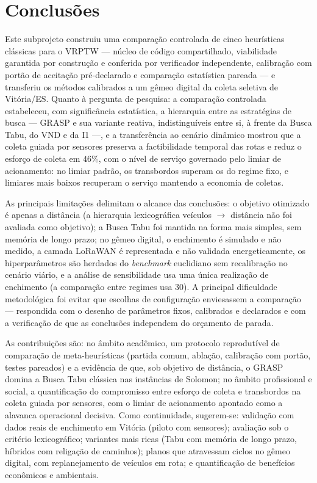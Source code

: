 \documentclass[10pt,a4paper]{article}
\begin{document}
\section{Conclusões}
Este subprojeto construiu uma comparação controlada de cinco heurísticas clássicas para o VRPTW --- núcleo de código compartilhado, viabilidade garantida por construção e conferida por verificador independente, calibração com portão de aceitação pré-declarado e comparação estatística pareada --- e transferiu os métodos calibrados a um gêmeo digital da coleta seletiva de Vitória/ES. Quanto à pergunta de pesquisa: a comparação controlada estabeleceu, com significância estatística, a hierarquia entre as estratégias de busca --- GRASP e sua variante reativa, indistinguíveis entre si, à frente da Busca Tabu, do VND e da I1 ---, e a transferência ao cenário dinâmico mostrou que a coleta guiada por sensores preserva a factibilidade temporal das rotas e reduz o esforço de coleta em $46\%$, com o nível de serviço governado pelo limiar de acionamento: no limiar padrão, os transbordos superam os do regime fixo, e limiares mais baixos recuperam o serviço mantendo a economia de coletas.

\vspace{\baselineskip}
As principais limitações delimitam o alcance das conclusões: o objetivo otimizado é apenas a distância (a hierarquia lexicográfica veículos $\rightarrow$ distância não foi avaliada como objetivo); a Busca Tabu foi mantida na forma mais simples, sem memória de longo prazo; no gêmeo digital, o enchimento é simulado e não medido, a camada LoRaWAN é representada e não validada energeticamente, os hiperparâmetros são herdados do \textit{benchmark} euclidiano sem recalibração no cenário viário, e a análise de sensibilidade usa uma única realização de enchimento (a comparação entre regimes usa 30). A principal dificuldade metodológica foi evitar que escolhas de configuração enviesassem a comparação --- respondida com o desenho de parâmetros fixos, calibrados e declarados e com a verificação de que as conclusões independem do orçamento de parada.

\vspace{\baselineskip}
As contribuições são: no âmbito acadêmico, um protocolo reprodutível de comparação de meta-heurísticas (partida comum, ablação, calibração com portão, testes pareados) e a evidência de que, sob objetivo de distância, o GRASP domina a Busca Tabu clássica nas instâncias de Solomon; no âmbito profissional e social, a quantificação do compromisso entre esforço de coleta e transbordos na coleta guiada por sensores, com o limiar de acionamento apontado como a alavanca operacional decisiva. Como continuidade, sugerem-se: validação com dados reais de enchimento em Vitória (piloto com sensores); avaliação sob o critério lexicográfico; variantes mais ricas (Tabu com memória de longo prazo, híbridos com religação de caminhos); planos que atravessam ciclos no gêmeo digital, com replanejamento de veículos em rota; e quantificação de benefícios econômicos e ambientais.
\end{document}
